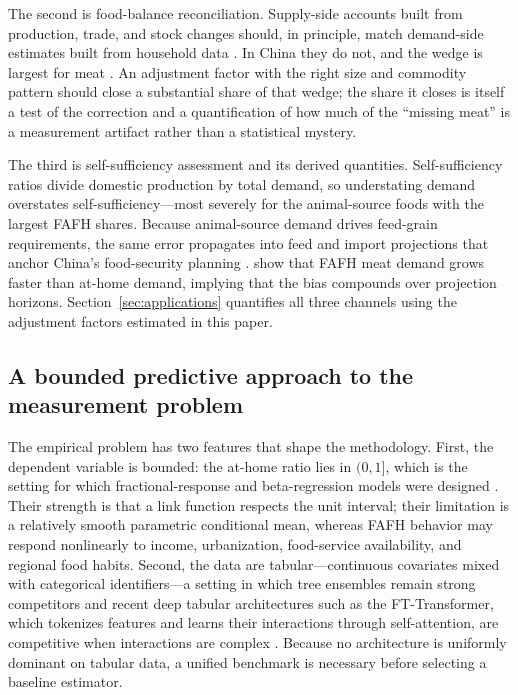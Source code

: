 \documentclass[preprint,12pt,authoryear]{elsarticle}
\begin{document}
The second is food-balance reconciliation. Supply-side accounts built from production, trade, and stock changes should, in principle, match demand-side estimates built from household data \citep{FAO2001FBS}. In China they do not, and the wedge is largest for meat \citep{MaHuangRozelle2004, YuAbler2014}. An adjustment factor with the right size and commodity pattern should close a substantial share of that wedge; the share it closes is itself a test of the correction and a quantification of how much of the ``missing meat'' is a measurement artifact rather than a statistical mystery.

The third is self-sufficiency assessment and its derived quantities. Self-sufficiency ratios divide domestic production by total demand, so understating demand overstates self-sufficiency---most severely for the animal-source foods with the largest FAFH shares. Because animal-source demand drives feed-grain requirements, the same error propagates into feed and import projections that anchor China's food-security planning \citep{FukaseMartin2016, HuangYang2017}. \citet{BaiSealeWahl2020} show that FAFH meat demand grows faster than at-home demand, implying that the bias compounds over projection horizons. Section~\ref{sec:applications} quantifies all three channels using the adjustment factors estimated in this paper.

\subsection{A bounded predictive approach to the measurement problem}

The empirical problem has two features that shape the methodology. First, the dependent variable is bounded: the at-home ratio lies in $(0,1]$, which is the setting for which fractional-response and beta-regression models were designed \citep{PapkeWooldridge1996, PapkeWooldridge2008, FerrariCribari2004}. Their strength is that a link function respects the unit interval; their limitation is a relatively smooth parametric conditional mean, whereas FAFH behavior may respond nonlinearly to income, urbanization, food-service availability, and regional food habits. Second, the data are tabular---continuous covariates mixed with categorical identifiers---a setting in which tree ensembles remain strong competitors \citep{GrinsztajnEtAl2022, ShwartzZivArmon2022} and recent deep tabular architectures such as the FT-Transformer, which tokenizes features and learns their interactions through self-attention, are competitive when interactions are complex \citep{GorishniyEtAl2021, RubachevEtAl2024}. Because no architecture is uniformly dominant on tabular data, a unified benchmark is necessary before selecting a baseline estimator.
\end{document}
